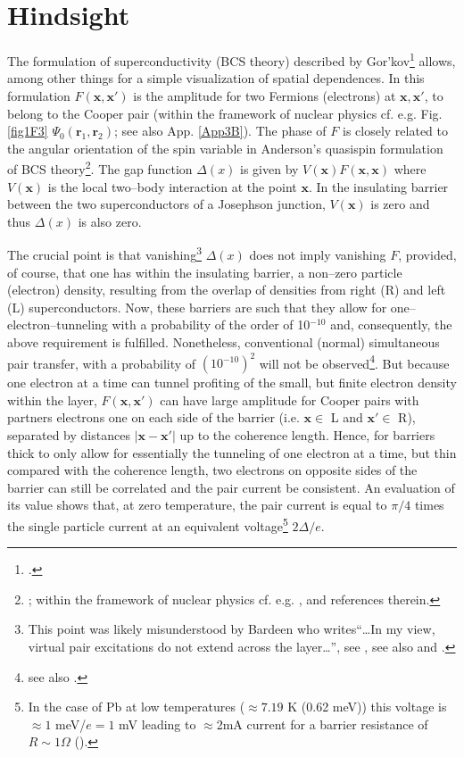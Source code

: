 \section{Hindsight}\label{C3AppE}
The formulation of superconductivity (BCS theory) described by Gor'kov\footnote{\cite{Gorkov:58,Gorkov:59}.} allows, among other things for a simple visualization of spatial dependences. In this formulation $F(\mathbf{x},\mathbf{x}')$ is the amplitude for two Fermions (electrons) at $\mathbf{x},\mathbf{x}'$, to belong to the Cooper pair (within the framework of nuclear physics cf. e.g. Fig. \ref{fig1F3} $\Psi_0(\mathbf{r}_1,\mathbf{r}_2)$; see also App. \ref{App3B}). The phase of $F$ is closely  related to the angular orientation of the spin variable  in Anderson's quasispin formulation of BCS theory\footnote{\cite{Anderson:58b}; within the framework of nuclear physics cf. e.g. \cite{Bohr:88}, \cite{Potel:13b} and references therein.}. The gap function $\Delta(x)$ is given by $V(\mathbf{x})F(\mathbf{x},\mathbf{x})$ where $V(\mathbf{x})$ is the local two--body interaction at the point $\mathbf x$. In the insulating barrier between the two superconductors of a Josephson junction, $V(\mathbf{x})$ is zero and thus $\Delta(x)$ is also zero. 



The crucial point is that vanishing\footnote{This point was likely misunderstood by Bardeen who writes``\dots In my view, virtual pair excitations do not extend across the layer\dots'', see \cite{McDonald:01}, see also \cite{Bardeen:61} and \cite{Bardeen:62}.} $\Delta(x)$ does not imply vanishing $F$, provided, of course, that one has within the insulating barrier, a non--zero particle (electron) density, resulting from the overlap of densities from right (R) and left (L) superconductors. Now, these barriers are such that they allow for one--electron--tunneling with a probability of the order of 10$^{-10}$ and, consequently, the above requirement is fulfilled. Nonetheless, conventional (normal) simultaneous pair transfer, with a probability of $(10^{-10})^2$ will not be observed\footnote{\cite{Pippard:12} see also \cite{McDonald:01}.}. But because one electron at a time can tunnel profiting of the small, but finite electron density within the layer,   $F(\mathbf{x},\mathbf{x}')$ can have large amplitude for Cooper pairs with partners electrons one on each side of the barrier (i.e. $\mathbf x\in$ L and $\mathbf x'\in$ R), separated by distances $|\mathbf{x}-\mathbf{x}'|$ up to the coherence length. Hence, for barriers thick to only allow for essentially the tunneling of one electron at a time, but thin compared with the coherence length, two electrons on opposite sides of the barrier can still be correlated and the pair current   be consistent. An evaluation of its 
value shows that, at zero temperature, the pair current is equal to $\pi/4$ times the single particle current at an equivalent voltage\footnote{In the case of Pb at low temperatures ($\approx7.19$ K (0.62 meV)) this voltage is $\approx 1$ meV/$e=1$ mV leading to $\approx$2mA current for a barrier resistance of $R\sim1\Omega$ (\cite{Ambegaokar:63,McDonald:01,Tinkham:96}).} $2\Delta/e$.


